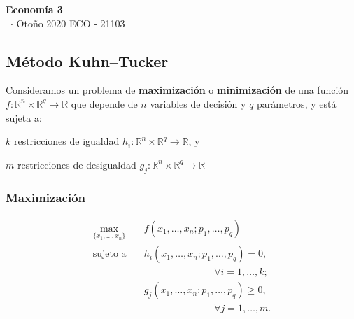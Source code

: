 \documentclass[8pt,a4paper]{extarticle}
\renewcommand{\csClass}{Economía 3}
\renewcommand{\csClassCode}{ECO - 21103}
\renewcommand{\csTerm}{Otoño 2020}
\begin{document}
\begin{titlepage}
    \begin{center}
	\vspace*{1cm}
	\Huge
        \textbf{\csClass}
	\vspace{0.5cm} \\
	\Large
        \cs\ $\cdot$ \csTerm
        \vfill
        \csAuthorName
	\vspace{0.8cm}
        \csClassCode\\
        \csSchool     
    \end{center}
\end{titlepage}

\begin{multicols}{3}
\setcounter{page}{1}

\section*{Método Kuhn–Tucker}

Consideramos un problema de \textbf{maximización} o \textbf{minimización} de una función $f : \mathbb{R}^n \times \mathbb{R}^q \to \mathbb{R}$ que depende de $n$ variables de decisión y $q$ parámetros, y está sujeta a:

\begin{bulletlist}
\item $k$ restricciones de igualdad $h_i : \mathbb{R}^n \times \mathbb{R}^q \to \mathbb{R}$, y
\item $m$ restricciones de desigualdad $g_j : \mathbb{R}^n \times \mathbb{R}^q \to \mathbb{R}$
\end{bulletlist}

\subsubsection*{Maximización}

\begin{equation*}
\begin{aligned}
	\max_{\{x_1, \ldots, x_n\}}\ & f(x_1, \ldots, x_n; p_1, \ldots, p_q) \\
	\text{sujeto a} \quad 		 & h_i(x_1, \ldots, x_n; p_1, \ldots, p_q) = 0,\\ & \qquad \qquad \qquad \quad \, \forall i = 1, \ldots, k; \\
								 & g_j(x_1, \ldots, x_n; p_1, \ldots, p_q) \ge 0,\\ & \qquad \qquad \qquad \quad \, \forall j = 1, \ldots, m.
\end{aligned}
\end{equation*}


\end{multicols}
\end{document}

